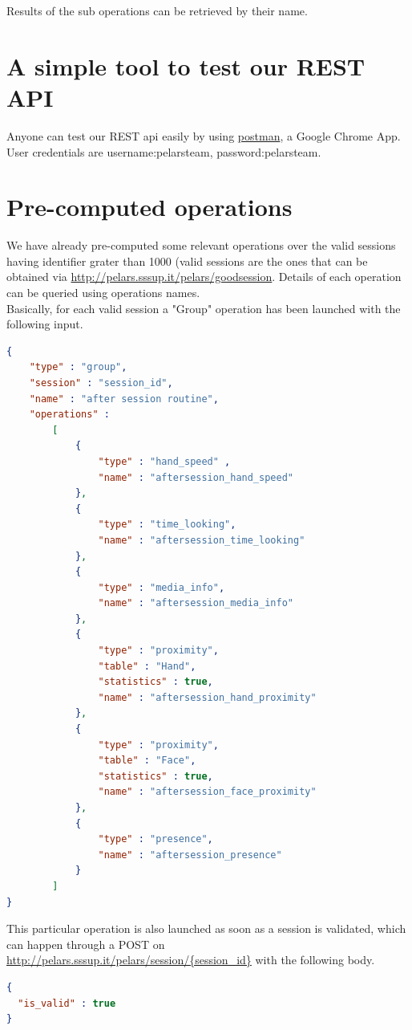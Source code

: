 \documentclass[a4paper,notitlepage,onecolumn]{hitec}  %
\begin{document}
Results of the sub operations can be retrieved by their name.

\section{A simple tool to test our REST API}
Anyone can test our REST api easily by using \href{https://chrome.google.com/webstore/detail/postman/fhbjgbiflinjbdggehcddcbncdddomop}{postman}, a Google Chrome App. User credentials are username:pelarsteam,  password:pelarsteam.

\section{Pre-computed operations}
We have already pre-computed some relevant operations over the valid sessions having identifier grater than 1000 (valid sessions are the ones that can be obtained via \url{http://pelars.sssup.it/pelars/goodsession}. Details of each operation can be queried using operations names. \\Basically, for each valid session a "Group" operation has been launched with the following input.

\begin{lstlisting}[language=json,firstnumber=1]
{
    "type" : "group",
    "session" : "session_id",
    "name" : "after session routine",
    "operations" : 
        [
            {
                "type" : "hand_speed" ,
                "name" : "aftersession_hand_speed"
            },
            {
                "type" : "time_looking",
                "name" : "aftersession_time_looking"
            },
            {
                "type" : "media_info",
                "name" : "aftersession_media_info"
            },
            {
                "type" : "proximity",
                "table" : "Hand",
                "statistics" : true,
                "name" : "aftersession_hand_proximity"
            },
            {
                "type" : "proximity",
                "table" : "Face",
                "statistics" : true,
                "name" : "aftersession_face_proximity"
            },
            {
                "type" : "presence",
                "name" : "aftersession_presence"
            }
        ]   
}
\end{lstlisting}

This particular operation is also launched as soon as a session is validated, which can happen through a POST on \url{http://pelars.sssup.it/pelars/session/{session\_id}} with the following body.
\begin{lstlisting}[language=json,firstnumber=1]
{
  "is_valid" : true
}
\end{lstlisting}



\end{document}
